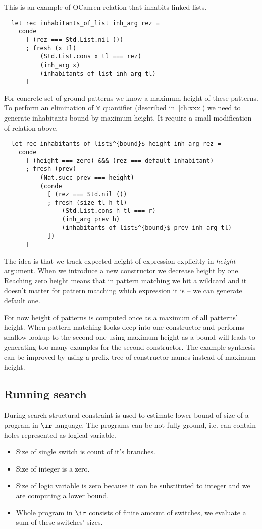 This is an example of OCanren relation that inhabits linked lists.
\begin{lstlisting}
  let rec inhabitants_of_list inh_arg rez =
    conde
      [ (rez === Std.List.nil ())
      ; fresh (x tl)
          (Std.List.cons x tl === rez)
          (inh_arg x)
          (inhabitants_of_list inh_arg tl)
      ]
\end{lstlisting}

For concrete set of ground patterns we know a maximum height of these patterns. To perform an elimination of $\forall$ quantifier (described in~\ref{ch:xxx}) we need to generate inhabitants bound by maximum height. It require a small modification of relation above.

\begin{lstlisting}
  let rec inhabitants_of_list$^{bound}$ height inh_arg rez =
    conde
      [ (height === zero) &&& (rez === default_inhabitant)
      ; fresh (prev)
          (Nat.succ prev === height)
          (conde
            [ (rez === Std.nil ())
            ; fresh (size_tl h tl)
                (Std.List.cons h tl === r)
                (inh_arg prev h)
                (inhabitants_of_list$^{bound}$ prev inh_arg tl)
            ])
      ]
\end{lstlisting}

The idea is that we track expected height of expression explicitly in $height$ argument. When we introduce a new constructor we decrease height by one. Reaching zero height means that in pattern matching we hit a wildcard and it doesn't matter for pattern matching which expression it is -- we can generate default one.

For now height of patterns is computed once as a maximum of all patterns' height. 
When pattern matching looks deep into one constructor and performs shallow lookup to the second one using maximum height as a bound will leads to generating too many examples for the second constructor. The example synthesis can be improved by using a prefix tree of constructor names instead of maximum height.

\subsection{Running search}
During search structural constraint is used to estimate lower bound of size of a program in $\ir$ language. The programs can be not fully ground, i.e. can contain holes represented as logical variable.
\begin{itemize}
\item Size of single switch is count of it's branches.
\item Size of integer is a zero.
\item Size of logic variable is zero because it can be substituted to integer and we are computing a lower bound.
\item Whole program in $\ir$ consists of finite amount of switches, we evaluate a sum of these switches' sizes.
\end{itemize}

